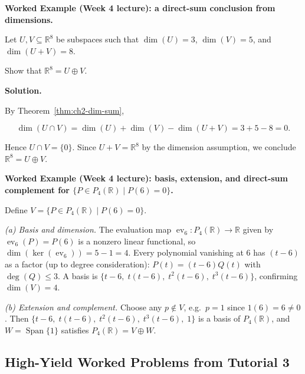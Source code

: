 \begin{examplebox}

\textbf{Worked Example (Week 4 lecture): a direct-sum conclusion from dimensions.}

Let $U,V\subseteq\mathbb{R}^8$ be subspaces such that $\dim(U)=3$, $\dim(V)=5$, and $\dim(U+V)=8$.

Show that $\mathbb{R}^8=U\oplus V$.

\medskip

\textbf{Solution.}

By Theorem~\ref{thm:ch2-dim-sum},

\[
\dim(U\cap V)=\dim(U)+\dim(V)-\dim(U+V)=3+5-8=0.
\]

Hence $U\cap V=\{0\}$. Since $U+V=\mathbb{R}^8$ by the dimension assumption, we conclude $\mathbb{R}^8=U\oplus V$.

\end{examplebox}

\begin{examplebox}
\textbf{Worked Example (Week 4 lecture): basis, extension, and direct-sum complement for $\{P\in P_4(\mathbb{R})\mid P(6)=0\}$.}

Define $V=\{P\in P_4(\mathbb{R})\mid P(6)=0\}$.

\medskip
\emph{(a) Basis and dimension.}
The evaluation map $\operatorname{ev}_6:P_4(\mathbb{R})\to\mathbb{R}$ given by $\operatorname{ev}_6(P)=P(6)$ is a nonzero linear functional, so $\dim(\ker(\operatorname{ev}_6))=5-1=4$.
Every polynomial vanishing at $6$ has $(t-6)$ as a factor (up to degree consideration): $P(t)=(t-6)Q(t)$ with $\deg(Q)\le 3$.
A basis is $\{t-6,\;t(t-6),\;t^2(t-6),\;t^3(t-6)\}$, confirming $\dim(V)=4$.

\medskip
\emph{(b) Extension and complement.}
Choose any $p\notin V$, e.g.\ $p=1$ since $1(6)=6\neq 0$.
Then $\{t-6,\;t(t-6),\;t^2(t-6),\;t^3(t-6),\;1\}$ is a basis of $P_4(\mathbb{R})$, and $W=\operatorname{Span}\{1\}$ satisfies $P_4(\mathbb{R})=V\oplus W$.
\end{examplebox}


\subsection{High-Yield Worked Problems from Tutorial 3}


